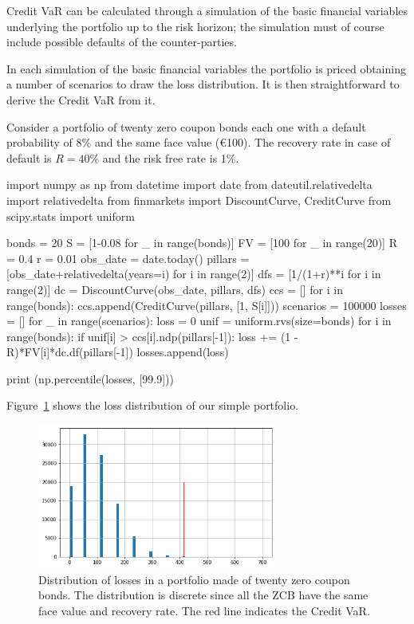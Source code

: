 Credit VaR can be calculated through a simulation of the basic financial variables underlying the portfolio up to the risk horizon; the simulation must of course include possible defaults of the counter-parties. 

In each simulation of the basic financial variables the portfolio is priced obtaining a number of scenarios to draw the loss distribution. It is then straightforward to derive the Credit VaR from it.

Consider a portfolio of twenty zero coupon bonds each one with a default probability of 8\% and the same face value (\euro{100}). The recovery rate in case of default is $R=40\%$ and the risk free rate is 1\%.

\begin{ipython}
import numpy as np
from datetime import date
from dateutil.relativedelta import relativedelta
from finmarkets import DiscountCurve, CreditCurve
from scipy.stats import uniform

bonds = 20
S = [1-0.08 for _ in range(bonds)]
FV = [100 for _ in range(20)]
R = 0.4
r = 0.01
obs_date = date.today()
pillars = [obs_date+relativedelta(years=i) for i in range(2)]
dfs = [1/(1+r)**i for i in range(2)]
dc = DiscountCurve(obs_date, pillars, dfs)
ccs = []
for i in range(bonds):
    ccs.append(CreditCurve(pillars, [1, S[i]]))
scenarios = 100000
losses = []
for _ in range(scenarios):
    loss = 0
    unif = uniform.rvs(size=bonds)
    for i in range(bonds):
        if unif[i] > ccs[i].ndp(pillars[-1]):
            loss += (1 - R)*FV[i]*dc.df(pillars[-1])
        losses.append(loss)

print (np.percentile(losses, [99.9]))
\end{ipython}
\begin{ioutput}
[415.84158416]
\end{ioutput}
\noindent
Figure~\ref{fig:credit_var} shows the loss distribution of our simple portfolio.

\begin{figure}[htb]
\centering
\includegraphics[width=0.7\textwidth]{figures/credit_var_zcb.png}
\caption{Distribution of losses in a portfolio made of twenty zero coupon bonds. The distribution is discrete since all the ZCB have the same face value and recovery rate. The red line indicates the Credit VaR.}
\label{fig:credit_var}
\end{figure}

